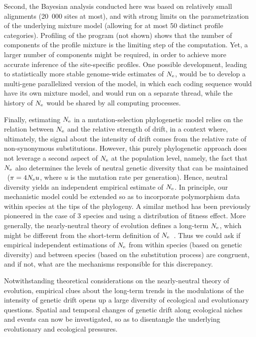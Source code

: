 \documentclass{article}
\begin{document}
Second, the Bayesian analysis conducted here was based on relatively small alignments (20~000 sites at most), and with strong limits on the parametrization of the underlying mixture model (allowing for at most 50 distinct profile categories).
Profiling of the program (not shown) shows that the number of components of the profile mixture is the limiting step of the computation.
Yet, a larger number of components might be required, in order to achieve more accurate inference of the site-specific profiles.
One possible development, leading to statistically more stable genome-wide estimates of $N_{\text{e}}$, would be to develop a multi-gene parallelized version of the model, in which each coding sequence would have its own mixture model, and would run on a separate thread, while the history of $N_{\text{e}}$ would be shared by all computing processes.

Finally, estimating $N_{\text{e}}$ in a mutation-selection phylogenetic model relies on the relation between $N_{\text{e}}$ and the relative strength of drift, in a context where, ultimately, the signal about the intensity of drift comes from the relative rate of {non-synonymous} substitutions.
However, this purely phylogenetic approach does not leverage a second aspect of $N_{\text{e}}$ at the population level, namely, the fact that $N_{\text{e}}$ also determines the levels of {neutral} genetic diversity that can be maintained ~($\pi=4N_{\text{e}} u$, where $u$ is the mutation rate per generation).
Hence, {neutral} diversity yields an independent empirical estimate of $N_{\text{e}}$.
In principle, our mechanistic model could be extended so as to incorporate polymorphism data within species at the tips of the phylogeny.
A similar method has been previously pioneered in the case of 3 species and using a distribution of fitness effect\citep{Wilson2011}.
More generally, the {nearly-neutral} theory of evolution defines a long-term $N_{\text{e}}$, which might be different from the short-term definition of $N_{\text{e}}$~\citep{Platt2018}.
Thus we could ask if empirical independent estimations of $N_{\text{e}}$ from within species (based on genetic diversity) and between species (based on the {substitution} process) are congruent, and if not, what are the mechanisms responsible for this discrepancy.

Notwithstanding theoretical considerations on the {nearly-neutral} theory of evolution, empirical clues about the long-term trends in the modulations of the intensity of {genetic drift} opens up a large diversity of ecological and evolutionary questions.
Spatial and temporal changes of {genetic drift} along ecological niches and events can now be investigated, so as to disentangle the underlying evolutionary and ecological pressures.
\end{document}
